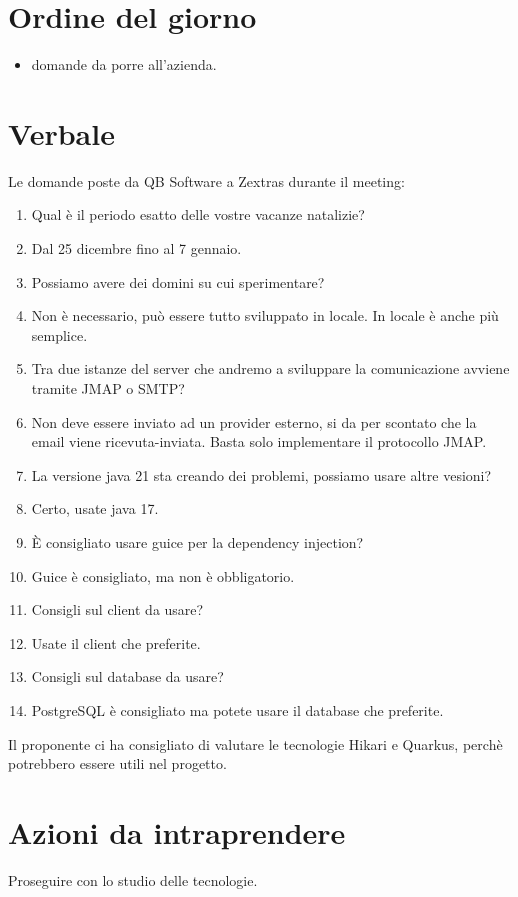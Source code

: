 \documentclass[12pt]{article}
\begin{document}
    \section{Ordine del giorno}
    \begin{itemize}
    	\item domande da porre all'azienda.
    \end{itemize}
    
    \section{Verbale}

    Le domande poste da QB Software a Zextras durante il meeting:

    \newcommand{\answer}{\item[\textbf{A:}]}
        
        \begin{enumerate}[label=\textbf{Q\arabic*:}]
            \item Qual è il periodo esatto delle vostre vacanze natalizie?
            \answer Dal 25 dicembre fino al 7 gennaio.

            \item Possiamo avere dei domini su cui sperimentare? 
            \answer Non è necessario, può essere tutto sviluppato in locale. In locale è anche più semplice.

            \item Tra due istanze del server che andremo a sviluppare la comunicazione avviene tramite JMAP o SMTP?
            \answer Non deve essere inviato ad un provider esterno, si da per scontato che la email viene ricevuta-inviata. Basta solo implementare il protocollo JMAP.
            
            \item La versione java 21 sta creando dei problemi, possiamo usare altre vesioni? 
            \answer Certo, usate java 17.
        
            \item È consigliato usare guice per la dependency injection?
            \answer Guice è consigliato, ma non è obbligatorio.
            
            \item Consigli sul client da usare?
            \answer Usate il client che preferite.

            \item Consigli sul database da usare?
            \answer PostgreSQL è consigliato ma potete usare il database che preferite.

        \end{enumerate}

        \noindent
        Il proponente ci ha consigliato di valutare le tecnologie Hikari e Quarkus, perchè potrebbero essere utili nel progetto.
    
    \section{Azioni da intraprendere}
    Proseguire con lo studio delle tecnologie.
\end{document}
